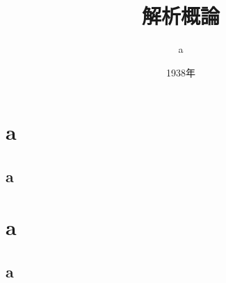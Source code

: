 \documentclass{jsbook}
\title{解析概論}
\author{a}
\date{1938年}
\begin{document}
\maketitle
\tableofcontents

\chapter{a}
 \section{a}
\chapter{a}
 \section{a}
\end{document}
